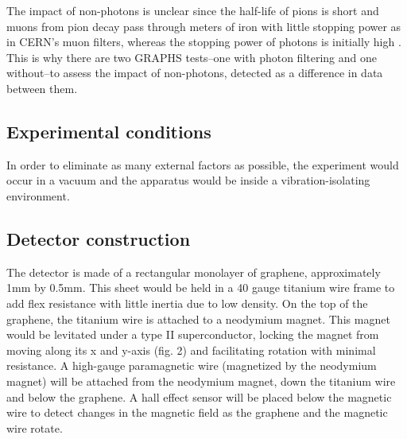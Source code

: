 \documentclass{article}
\begin{document}
    The impact of non-photons is unclear since the half-life of pions is short and muons from pion decay pass through meters of iron with little stopping power as in CERN's muon filters\cite{BEAM2018}, whereas the stopping power of photons is initially high \cite{SABIN}. This is why there are two GRAPHS tests--one with photon filtering and one without--to assess the impact of non-photons, detected as a difference in data between them.

    \subsection{Experimental conditions}

    \indent In order to eliminate as many external factors as possible, the experiment would occur in a vacuum and the apparatus would be inside a vibration-isolating environment.

    \subsection{Detector construction}

\indent The detector is made of a rectangular monolayer of graphene, approximately 1mm by 0.5mm. This sheet would be held in a 40 gauge titanium wire frame to add flex resistance with little inertia due to low density. On the top of the graphene, the titanium wire is attached to a neodymium magnet. This magnet would be levitated under a type II superconductor, locking the magnet from moving along its x and y-axis (fig. 2) and facilitating rotation with minimal resistance. A high-gauge paramagnetic wire (magnetized by the neodymium magnet) will be attached from the neodymium magnet, down the titanium wire and below the graphene. A hall effect sensor will be placed below the magnetic wire to detect changes in the magnetic field as the graphene and the magnetic wire rotate.
\end{document}
